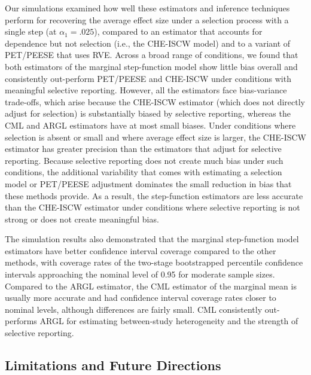 \documentclass[
  american,
  man, donotrepeattitle,floatsintext]{apa7}
\begin{document}
Our simulations examined how well these estimators and inference techniques perform for recovering the average effect size under a selection process with a single step (at \(\alpha_1 = .025\)), compared to an estimator that accounts for dependence but not selection (i.e., the CHE-ISCW model) and to a variant of PET/PEESE that uses RVE.
Across a broad range of conditions, we found that both estimators of the marginal step-function model show little bias overall and consistently out-perform PET/PEESE and CHE-ISCW under conditions with meaningful selective reporting.
However, all the estimators face bias-variance trade-offs, which arise because the CHE-ISCW estimator (which does not directly adjust for selection) is substantially biased by selective reporting, whereas the CML and ARGL estimators have at most small biases.
Under conditions where selection is absent or small and where average effect size is larger, the CHE-ISCW estimator has greater precision than the estimators that adjust for selective reporting.
Because selective reporting does not create much bias under such conditions, the additional variability that comes with estimating a selection model or PET/PEESE adjustment dominates the small reduction in bias that these methods provide.
As a result, the step-function estimators are less accurate than the CHE-ISCW estimator under conditions where selective reporting is not strong or does not create meaningful bias.

The simulation results also demonstrated that the marginal step-function model estimators have better confidence interval coverage compared to the other methods, with coverage rates of the two-stage bootstrapped percentile confidence intervals approaching the nominal level of 0.95 for moderate sample sizes.
Compared to the ARGL estimator, the CML estimator of the marginal mean is usually more accurate and had confidence interval coverage rates closer to nominal levels, although differences are fairly small.
CML consistently out-performs ARGL for estimating between-study heterogeneity and the strength of selective reporting.

\subsection{Limitations and Future Directions}\label{limitations-and-future-directions}
\end{document}
